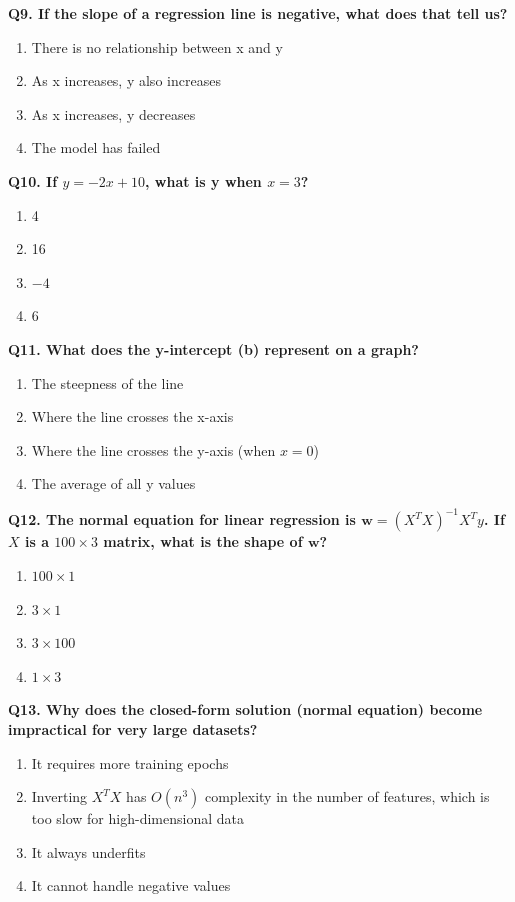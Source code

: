 \documentclass[12pt, a4paper]{article}
\newcommand{\question}[1]{\vspace{0.6em}\noindent\textbf{#1}}
\begin{document}
\question{Q9. If the slope of a regression line is negative, what does that tell us?}
\begin{enumerate}[label=\alph*)]
    \item There is no relationship between x and y
    \item As x increases, y also increases
    \item As x increases, y decreases
    \item The model has failed
\end{enumerate}

\question{Q10. If $y = -2x + 10$, what is y when $x = 3$?}
\begin{enumerate}[label=\alph*)]
    \item 4
    \item 16
    \item $-4$
    \item 6
\end{enumerate}

\question{Q11. What does the y-intercept (b) represent on a graph?}
\begin{enumerate}[label=\alph*)]
    \item The steepness of the line
    \item Where the line crosses the x-axis
    \item Where the line crosses the y-axis (when $x = 0$)
    \item The average of all y values
\end{enumerate}

\question{Q12. The normal equation for linear regression is $\mathbf{w} = (X^TX)^{-1}X^Ty$. If $X$ is a $100 \times 3$ matrix, what is the shape of $\mathbf{w}$?}
\begin{enumerate}[label=\alph*)]
    \item $100 \times 1$
    \item $3 \times 1$
    \item $3 \times 100$
    \item $1 \times 3$
\end{enumerate}

\question{Q13. Why does the closed-form solution (normal equation) become impractical for very large datasets?}
\begin{enumerate}[label=\alph*)]
    \item It requires more training epochs
    \item Inverting $X^TX$ has $O(n^3)$ complexity in the number of features, which is too slow for high-dimensional data
    \item It always underfits
    \item It cannot handle negative values
\end{enumerate}
\end{document}
